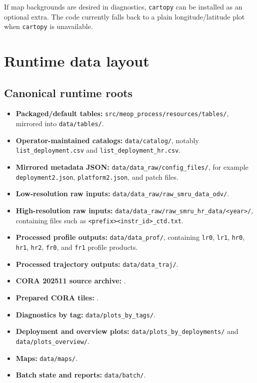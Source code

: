 \documentclass[11pt,a4paper]{article}
\newcommand{\pkg}[1]{\texttt{#1}}
\begin{document}
If map backgrounds are desired in diagnostics, \pkg{cartopy} can be installed as an optional extra. The code currently falls back to a plain longitude/latitude plot when \pkg{cartopy} is unavailable.

\section{Runtime data layout}

\subsection{Canonical runtime roots}

\begin{itemize}[leftmargin=1.5em]
  \item \textbf{Packaged/default tables:} \pkg{src/meop\_process/resources/tables/}, mirrored into \pkg{data/tables/}.
  \item \textbf{Operator-maintained catalogs:} \pkg{data/catalog/}, notably \pkg{list\_deployment.csv} and \pkg{list\_deployment\_hr.csv}.
  \item \textbf{Mirrored metadata JSON:} \pkg{data/data\_raw/config\_files/}, for example \pkg{deployment2.json}, \pkg{platform2.json}, and patch files.
  \item \textbf{Low-resolution raw inputs:} \pkg{data/data\_raw/raw\_smru\_data\_odv/}.
  \item \textbf{High-resolution raw inputs:} \pkg{data/data\_raw/raw\_smru\_hr\_data/<year>/}, containing files such as \pkg{<prefix><instr\_id>\_ctd.txt}.
  \item \textbf{Processed profile outputs:} \pkg{data/data\_prof/}, containing \pkg{lr0}, \pkg{lr1}, \pkg{hr0}, \pkg{hr1}, \pkg{hr2}, \pkg{fr0}, and \pkg{fr1} profile products.
  \item \textbf{Processed trajectory outputs:} \pkg{data/data\_traj/}.
  \item \textbf{CORA 202511 source archive:} .
  \item \textbf{Prepared CORA tiles:} .
  \item \textbf{Diagnostics by tag:} \pkg{data/plots\_by\_tags/}.
  \item \textbf{Deployment and overview plots:} \pkg{data/plots\_by\_deployments/} and \pkg{data/plots\_overview/}.
  \item \textbf{Maps:} \pkg{data/maps/}.
  \item \textbf{Batch state and reports:} \pkg{data/batch/}.
\end{itemize}
\end{document}
